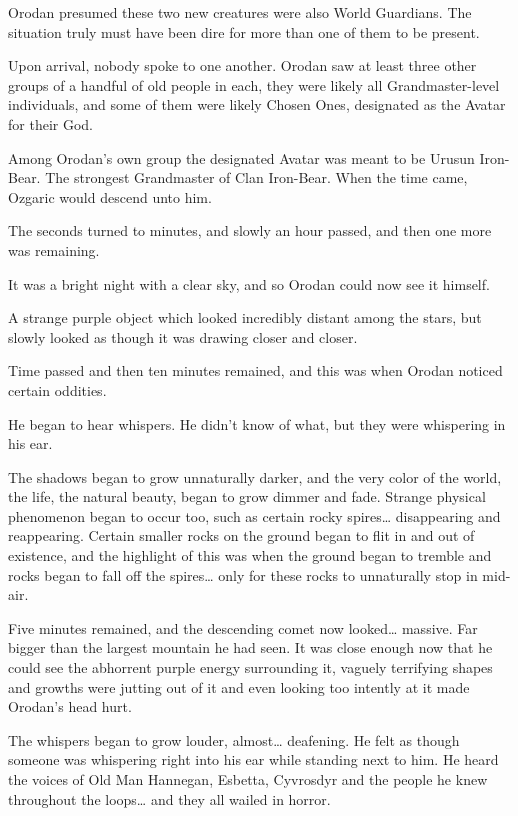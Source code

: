 \documentclass[a4paper,10pt]{book}
\begin{document}
Orodan presumed these two new creatures were also World Guardians. The situation truly must have been dire for more than one of them to be present.\par
Upon arrival, nobody spoke to one another. Orodan saw at least three other groups of a handful of old people in each, they were likely all Grandmaster-level individuals, and some of them were likely Chosen Ones, designated as the Avatar for their God.\par
Among Orodan’s own group the designated Avatar was meant to be Urusun Iron-Bear. The strongest Grandmaster of Clan Iron-Bear. When the time came, Ozgaric would descend unto him.\par
The seconds turned to minutes, and slowly an hour passed, and then one more was remaining.\par
It was a bright night with a clear sky, and so Orodan could now see it himself.\par
A strange purple object which looked incredibly distant among the stars, but slowly looked as though it was drawing closer and closer.\par
Time passed and then ten minutes remained, and this was when Orodan noticed certain oddities.\par
He began to hear whispers. He didn’t know of what, but they were whispering in his ear.\par
The shadows began to grow unnaturally darker, and the very color of the world, the life, the natural beauty, began to grow dimmer and fade. Strange physical phenomenon began to occur too, such as certain rocky spires… disappearing and reappearing. Certain smaller rocks on the ground began to flit in and out of existence, and the highlight of this was when the ground began to tremble and rocks began to fall off the spires… only for these rocks to unnaturally stop in mid-air.\par
Five minutes remained, and the descending comet now looked… massive. Far bigger than the largest mountain he had seen. It was close enough now that he could see the abhorrent purple energy surrounding it, vaguely terrifying shapes and growths were jutting out of it and even looking too intently at it made Orodan’s head hurt.\par
The whispers began to grow louder, almost… deafening. He felt as though someone was whispering right into his ear while standing next to him. He heard the voices of Old Man Hannegan, Esbetta, Cyvrosdyr and the people he knew throughout the loops… and they all wailed in horror.\par
\end{document}
